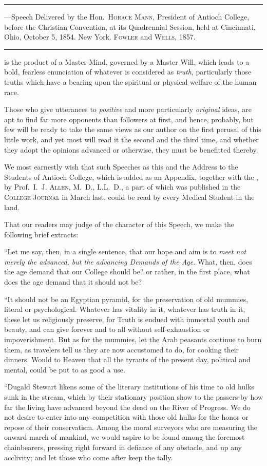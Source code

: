
\fancybreak{* * *}
\footnotesize
{}---Speech Delivered by the Hon.~\textsc{Horace Mann}, President of
Antioch College, before the Christian Convention, at its Quadrennial Session, held at
Cincinnati, Ohio, October 5, 1854. New York. \textsc{Fowler} and \textsc{Wells}, 1857.
\plainbreak{1}
\normalsize

 is the product of a Master Mind, governed by a Master Will,
which leads to a bold, fearless enunciation of whatever is considered as
\emph{truth}, particularly those truths which have a bearing upon the spiritual
or physical welfare of the human race.

Those who give utterances to \emph{positive} and more particularly \emph{original}
ideas, are apt to find far more opponents than followers at first, and
hence, probably, but few will be ready to take the same views as our
author on the first perusal of this little work, and yet most will read it
the second and the third time, and whether they adopt the opinions
advanced or otherwise, they must be benefitted thereby.

We most earnestly wish that such Speeches as this and the Address
to the Students of Antioch College, which is added as an Appendix,
together with the , by Prof.~I.~J. \textsc{Allen}, M.~D., L.L.~D., a part of which was
published in the \textsc{College Journal} in March last, could be read by every
Medical Student in the land.

That our readers may judge of the character of this Speech, we
make the following brief extracts:

``Let me say, then, in a single sentence, that our hope and aim is to
\emph{meet not merely the advanced, but the advancing Demands of the Age}.
What, then, does the age demand that our College should be? or rather,
in the first place, what does the age demand that it should not be?

``It should not be an Egyptian pyramid, for the preservation of old
mummies, literal or psychological. Whatever has vitality in it, whatever
has truth in it, these let us religiously preserve, for Truth is endued
with immortal youth and beauty, and can give forever and to all without
self-exhaustion or impoverishment. But as for the mummies, let
the Arab peasants continue to burn them, as travelers tell us they are
now accustomed to do, for cooking their dinners. Would to Heaven
that all the tyrants of the present day, political and mental, could be
put to as good a use.

``Dugald Stewart likens some of the literary institutions of his time
to old hulks sunk in the stream, which by their stationary position
show to the passers-by how far the living have advanced beyond the
dead on the River of Progress. We do not desire to enter into any
competition with those old hulks for the honor or repose of their conservatism.
Among the moral surveyors who are measuring the onward
march of mankind, we would aspire to be found among the foremost
chainbearers, pressing right forward in defiance of any obstacle, and
up any acclivity; and let those who come after keep the tally.\endinput
